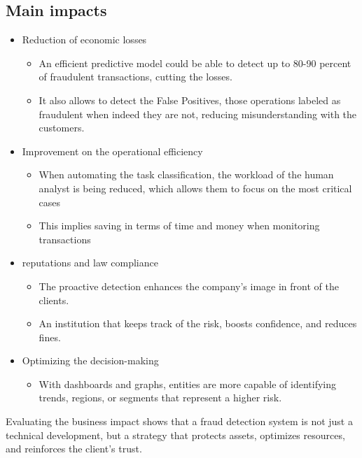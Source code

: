 \documentclass[12pt]{report} %
\begin{document}
\subsection{Main impacts}
\begin{itemize}
    \item Reduction of economic losses
    \begin{itemize}
        \item An efficient predictive model could be able to detect up to 80-90 percent of fraudulent transactions, cutting the losses.
        \item It also allows to detect the False Positives, those operations labeled as fraudulent when indeed they are not, reducing misunderstanding with the customers.
    \end{itemize}
    \item Improvement on the operational efficiency
    \begin{itemize}
        \item When automating the task classification, the workload of the human analyst is being reduced, which allows them to focus on the most critical cases
        \item This implies saving in terms of time and money when monitoring transactions
    \end{itemize}
    \item reputations and law compliance
    \begin{itemize}
        \item The proactive detection enhances the company's image in front of the clients.
        \item An institution that keeps track of the risk, boosts confidence, and reduces fines.
    \end{itemize}
    \item Optimizing the decision-making
    \begin{itemize}
        \item With dashboards and graphs, entities are more capable of identifying trends, regions, or segments that represent a higher risk.
    \end{itemize}
\end{itemize}
Evaluating the business impact shows that a fraud detection system is not just a technical development, but a strategy that protects assets, optimizes resources, and reinforces the client's trust. 
\end{document}

